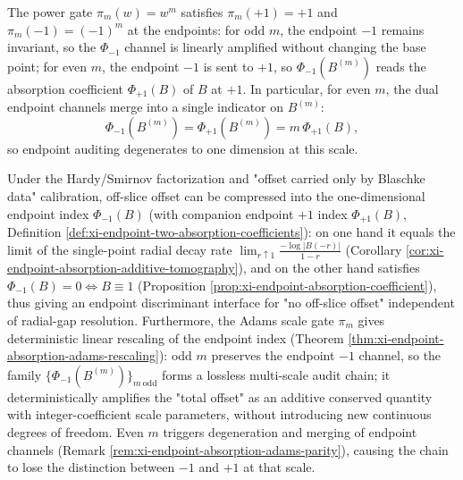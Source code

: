 \begin{remark}\label{rem:xi-endpoint-absorption-adams-parity}
The power gate \(\pi_m(w)=w^m\) satisfies \(\pi_m(+1)=+1\) and \(\pi_m(-1)=(-1)^m\) at the endpoints:
for odd \(m\), the endpoint \(-1\) remains invariant, so the \(\Phi_{-1}\) channel is linearly amplified without changing the base point;
for even \(m\), the endpoint \(-1\) is sent to \(+1\), so \(\Phi_{-1}(B^{(m)})\) reads the absorption coefficient \(\Phi_{+1}(B)\) of \(B\) at \(+1\).
In particular, for even \(m\), the dual endpoint channels merge into a single indicator on \(B^{(m)}\):
\[
\Phi_{-1}(B^{(m)})=\Phi_{+1}(B^{(m)})=m\,\Phi_{+1}(B),
\]
so endpoint auditing degenerates to one dimension at this scale.
\end{remark}

\begin{remark}\label{rem:xi-endpoint-absorption-terminal-index}
Under the Hardy/Smirnov factorization and "offset carried only by Blaschke data" calibration, off-slice offset can be compressed into the one-dimensional endpoint index \(\Phi_{-1}(B)\) (with companion endpoint \(+1\) index \(\Phi_{+1}(B)\), Definition \ref{def:xi-endpoint-two-absorption-coefficients}):
on one hand it equals the limit of the single-point radial decay rate \(\lim_{r\uparrow 1}\frac{-\log|B(-r)|}{1-r}\) (Corollary \ref{cor:xi-endpoint-absorption-additive-tomography}), and on the other hand satisfies \(\Phi_{-1}(B)=0\iff B\equiv 1\) (Proposition \ref{prop:xi-endpoint-absorption-coefficient}), thus giving an endpoint discriminant interface for "no off-slice offset" independent of radial-gap resolution.
Furthermore, the Adams scale gate \(\pi_m\) gives deterministic linear rescaling of the endpoint index (Theorem \ref{thm:xi-endpoint-absorption-adams-rescaling}):
odd \(m\) preserves the endpoint \(-1\) channel, so the family \(\{\Phi_{-1}(B^{(m)})\}_{m\ \mathrm{odd}}\) forms a lossless multi-scale audit chain; it deterministically amplifies the "total offset" as an additive conserved quantity with integer-coefficient scale parameters, without introducing new continuous degrees of freedom.
Even \(m\) triggers degeneration and merging of endpoint channels (Remark \ref{rem:xi-endpoint-absorption-adams-parity}), causing the chain to lose the distinction between \(-1\) and \(+1\) at that scale.
\end{remark}

